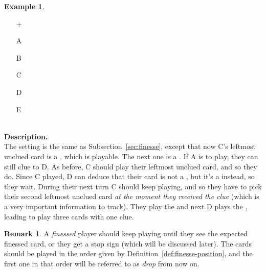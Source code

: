 \documentclass[a4paper]{article}
\theoremstyle{plain}
\theoremstyle{definition}
\newtheorem{remark}[theorem]{Remark}
\newtheorem{example}[theorem]{Example}
\begin{document}
\begin{example} \hfill \\
	\begin{minipage}{0.45\textwidth}
		\begin{itemize}
			\item[\Large +]      
			\item[\Large A]    
			\item[\Large B]    
			\item[\Large C]    
			\item[\Large D]    
			\item[\Large E]    
		\end{itemize}
	\end{minipage}%
	\begin{minipage}{0.55\textwidth}
		\hfill \\
		
		\textbf{Description.} \\
		
		The setting is the same as Subsection~\ref{sec:finesse}, except that now C's leftmost unclued card is a , which is playable. The next one is a . If A is to play, they can still clue  to D. As before, C should play their leftmost unclued card, and so they do. Since C played, D can deduce that their card is not a , but it's a  instead, so they wait. During their next turn C should keep playing, and so they have to pick their second leftmost unclued card \emph{at the moment they received the clue} (which is a very important information to track). They play the  and next D plays the , leading to play three cards with one clue.
	\end{minipage}
\end{example} \vspace{0.15 cm}

\begin{remark}
	A \emph{finessed} player should keep playing until they see the expected finessed card, or they get a stop sign (which will be discussed later). The cards should be played in the order given by Definition~\ref{def:finesse-position}, and the first one in that order will be referred to as \emph{drop} from now on.
\end{remark}
\end{document}
